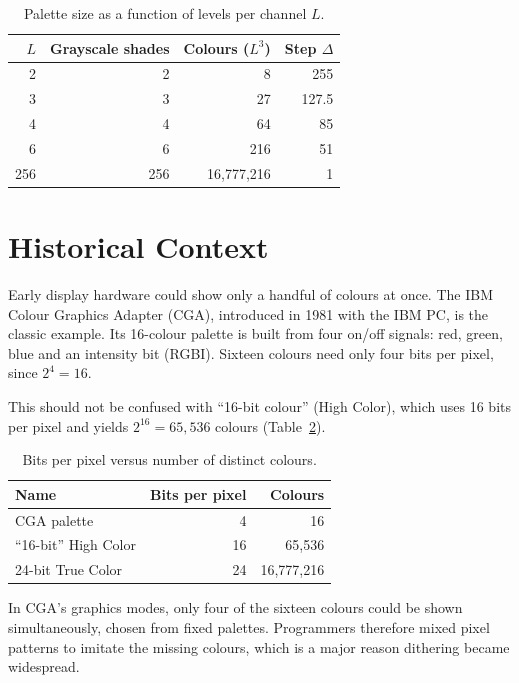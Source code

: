 \documentclass[11pt,a4paper]{article}
\begin{document}
\begin{table}[htbp]
  \centering
  \caption{Palette size as a function of levels per channel $L$.}
  \label{tab:levels}
  \begin{tabular}{rrrr}
    \toprule
    $L$ & Grayscale shades & Colours ($L^3$) & Step $\Delta$ \\
    \midrule
    2   & 2   & 8          & 255   \\
    3   & 3   & 27         & 127.5 \\
    4   & 4   & 64         & 85    \\
    6   & 6   & 216        & 51    \\
    256 & 256 & 16,777,216 & 1     \\
    \bottomrule
  \end{tabular}
\end{table}

\section{Historical Context}
\label{sec:history}

Early display hardware could show only a handful of colours at once. The
IBM Colour Graphics Adapter (CGA), introduced in 1981 with the IBM PC, is the
classic example. Its 16-colour palette is built from four on/off signals:
red, green, blue and an intensity bit (RGBI). Sixteen colours need only
four bits per pixel, since $2^4 = 16$.

This should not be confused with ``16-bit colour'' (High Color), which uses
16 bits per pixel and yields $2^{16} = 65{,}536$ colours
(Table~\ref{tab:bits}).

\begin{table}[htbp]
  \centering
  \caption{Bits per pixel versus number of distinct colours.}
  \label{tab:bits}
  \begin{tabular}{lrr}
    \toprule
    Name & Bits per pixel & Colours \\
    \midrule
    CGA palette          & 4  & 16         \\
    ``16-bit'' High Color & 16 & 65,536     \\
    24-bit True Color    & 24 & 16,777,216 \\
    \bottomrule
  \end{tabular}
\end{table}

In CGA's graphics modes, only four of the sixteen colours could be shown
simultaneously, chosen from fixed palettes. Programmers therefore mixed
pixel patterns to imitate the missing colours, which is a major reason
dithering became widespread. 
\end{document}

